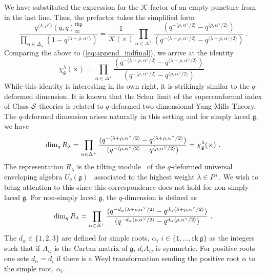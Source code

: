 \documentclass[a4paper]{article}
\def\SS{{\cal S}}
\def\dim{{\rm dim}}
\def\gf{\mathfrak{g}}
\begin{document}
We have substituted the expression for the $\mathcal{K}$-factor of an empty puncture from~\cite{Lemos:2012ph} in the last line. Thus, the prefactor takes the simplified form
\begin{equation}
	\frac{q^{\langle\lambda,\rho^\vee\rangle} (q,q)_\infty^{\mathrm{rk}\mathfrak{g}}}{\prod_{\alpha\in\Delta_+} \left( 1-q^{\langle\lambda + \rho,\alpha^\vee\rangle} \right)} = \frac{1}{\mathcal{K}(\times)}\prod_{\alpha\in\Delta^+} \frac{ (q^{-\langle \rho,\alpha^\vee/2\rangle}-q^{\langle \rho,\alpha^\vee/2\rangle})}{(q^{-\langle\lambda+\rho,\alpha^\vee/2\rangle}-q^{\langle\lambda+\rho,\alpha^\vee/2\rangle})}~.
\end{equation}
Comparing the above to (\ref{eq:append_indfinal}), we arrive at the identity
\begin{equation}\label{eq:append_chi}
	\chi^\lambda_\gf(\times) =\prod_{\alpha\in\Delta^+} \frac{(q^{-\langle\lambda+\rho,\alpha^\vee/2\rangle}-q^{\langle\lambda+\rho,\alpha^\vee/2\rangle})}{ (q^{-\langle \rho,\alpha^\vee/2\rangle}-q^{\langle \rho,\alpha^\vee/2\rangle})}~.
\end{equation}
While this identity is interesting in its own right, it is strikingly similar to the $q$-deformed dimension. It is known that the Schur limit of the superconformal index of Class $\SS$ theories is related to $q$-deformed two dimensional Yang-Mills Theory. The $q$-deformed dimension arises naturally in this setting and for simply laced $\gf$, we have
\begin{equation}
	\dim_q\, R_\lambda = \prod_{\alpha\in\Delta^+} \frac{(q^{-\langle\lambda+\rho,\alpha^\vee/2\rangle}-q^{\langle\lambda+\rho,\alpha^\vee/2\rangle})}{ (q^{-\langle \rho,\alpha^\vee/2\rangle}-q^{\langle \rho,\alpha^\vee/2\rangle})} = \chi^\lambda_\gf(\times)~.
\end{equation}
The representation $R_\lambda$ is the tilting module~\cite{Andersen1992} of the $q$-deformed universal enveloping algebra $U_q(\gf)$~\cite{Jimbo:1985zk} associated to the highest weight $\lambda\in P^+$. We wish to bring attention to this since this correspondence does not hold for non-simply laced $\gf$. For non-simply laced $\gf$, the $q$-dimension is defined as
\begin{equation}
	\dim_q\, R_\lambda = \prod_{\alpha\in\Delta^+} \frac{(q^{-d_\alpha\langle\lambda+\rho,\alpha^\vee/2\rangle}-q^{d_\alpha\langle\lambda+\rho,\alpha^\vee/2\rangle})}{ (q^{-d_\alpha\langle \rho,\alpha^\vee/2\rangle}-q^{d_\alpha\langle \rho,\alpha^\vee/2\rangle})}~.
\end{equation}
The $d_\alpha\in\{1,2,3\}$ are defined for simple roots, $\alpha_i$ $i\in\{1,\dots,\mathrm{rk}\,\gf\}$ as the integers such that if $A_{ij}$ is the Cartan matrix of $\gf$, $d_iA_{ij}$ is symmetric. For positive roots one sets $d_\alpha = d_i$ if there is a Weyl transformation sending the positive root $\alpha$ to the simple root, $\alpha_i$.
\end{document}
